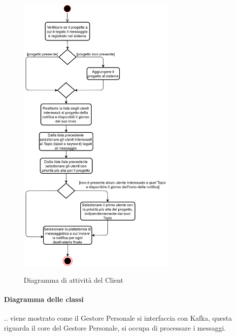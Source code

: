 \begin{figure}[H]
    \centering
    \includegraphics[width=0.69\textwidth]{img/Client_attivita.png}\\
    \caption{Diagramma di attività del Client}
\end{figure}

    \paragraph{Diagramma delle classi}
    .. viene mostrato come il Gestore Personale si interfaccia con Kafka, questa riguarda il core del Gestore Personale, si occupa di processare
    i messaggi.

